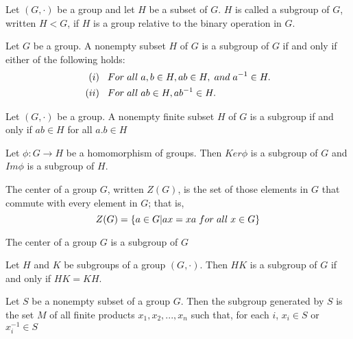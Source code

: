 \begin{defi}
Let $(G,\cdot)$ be a group and let $H$ be a subset of $G$. $H$ is called a subgroup of $G$, written $H<G$, if $H$ is a group relative to the binary operation in $G$.
\end{defi}

\begin{teo}
Let $G$ be a group. A nonempty subset $H$ of $G$ is a subgroup of $G$ if and only if either of the following holds:
\begin{align*}
    (i)&\hspace{.3cm}For\hspace{.1cm}all\hspace{.1cm}a,b\in H, ab\in H,\hspace{.1cm}and\hspace{.1cm}a^{-1}\in H.\\
    (ii)&\hspace{.3cm}For\hspace{.1cm}all\hspace{.1cm}ab\in H, ab^{-1}\in H.
\end{align*}
\end{teo}
\begin{teo}
    Let $(G,\cdot)$ be a group. A nonempty finite subset $H$ of $G$ is a subgroup if and only if $ab\in H$ for all $a.b\in H$
\end{teo}
\begin{teo}
    Let $\phi:G\rightarrow H$ be a homomorphism of groups. Then $Ker\phi$ is a subgroup of $G$ and $Im\phi$ is a subgroup of $H$.
\end{teo}
\begin{defi}
    The center of a group $G$, written $Z(G)$, is the set of those elements in $G$ that commute with every element in $G$; that is,
    \begin{equation*}
        Z(G)=\{a\in G|ax=xa\hspace{.1cm}for\hspace{.1cm}all\hspace{.1cm}x\in G\}
    \end{equation*}
\end{defi}
\begin{teo}
    The center of a group $G$ is a subgroup of $G$
\end{teo}
\begin{teo}
    Let $H$ and $K$ be subgroups of a group $(G,\cdot)$. Then $HK$ is a subgroup of $G$ if and only if $HK=KH$.
\end{teo}
\begin{teo}
    Let $S$ be a nonempty subset of a group $G$. Then the subgroup generated by $S$ is the set $M$ of all finite products $x_1,x_2,...,x_n$ such that, for each $i$, $x_i\in S$ or $x_i^{-1}\in S$
\end{teo}